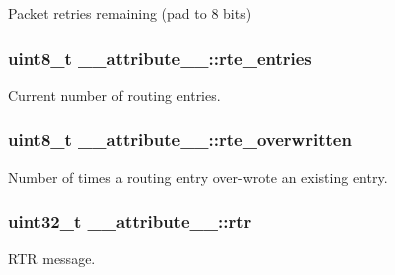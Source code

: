 Packet retries remaining (pad to 8 bits) 

\subsubsection[{\texorpdfstring{rte\+\_\+entries}{rte_entries}}]{\setlength{\rightskip}{0pt plus 5cm}uint8\+\_\+t \+\_\+\+\_\+attribute\+\_\+\+\_\+\+::rte\+\_\+entries}\hypertarget{struct____attribute_____adbc91f28865d1eae6895599dc900465b}{}\label{struct____attribute_____adbc91f28865d1eae6895599dc900465b}


Current number of routing entries. 

\subsubsection[{\texorpdfstring{rte\+\_\+overwritten}{rte_overwritten}}]{\setlength{\rightskip}{0pt plus 5cm}uint8\+\_\+t \+\_\+\+\_\+attribute\+\_\+\+\_\+\+::rte\+\_\+overwritten}\hypertarget{struct____attribute_____a9ea2df6bafe8f3ef1c124a962b028bcb}{}\label{struct____attribute_____a9ea2df6bafe8f3ef1c124a962b028bcb}


Number of times a routing entry over-\/wrote an existing entry. 

\subsubsection[{\texorpdfstring{rtr}{rtr}}]{\setlength{\rightskip}{0pt plus 5cm}uint32\+\_\+t \+\_\+\+\_\+attribute\+\_\+\+\_\+\+::rtr}\hypertarget{struct____attribute_____aee214ea38d7e1f8c3dc6e84f3993fdec}{}\label{struct____attribute_____aee214ea38d7e1f8c3dc6e84f3993fdec}


R\+TR message. 

